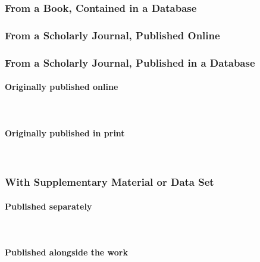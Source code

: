 \documentclass{ltxdockit}
\newcommand{\myparagraph}[1]{\paragraph{#1}\mbox{}\\}
\begin{document}
\subsubsection{From a Book, Contained in a Database} %
\label{sub:from_a_book_contained_in_a_database}
\begin{refsection}
	\printbibliography[heading=none]
\end{refsection}
\subsubsection{From a Scholarly Journal, Published Online} %
\label{sub:from_a_scholarly_journal_published_online}
\begin{refsection}
	\printbibliography[heading=none]
\end{refsection}
\subsubsection{From a Scholarly Journal, Published in a Database} %
\label{sub:from_a_scholarly_journal_published_in_a_database}
\myparagraph{Originally published online} %
\label{ssub:originally_published_online}
\begin{refsection}
	\printbibliography[heading=none]
\end{refsection}
\myparagraph{Originally published in print} %
\label{ssub:originally_published_in_print}
\begin{refsection}
	\printbibliography[heading=none]
\end{refsection}
\subsubsection{With Supplementary Material or Data Set} %
\label{sub:with_supplementary_material_or_data_set}
\myparagraph{Published separately} %
\label{ssub:published_separately}
\begin{refsection}
	\printbibliography[heading=none]
\end{refsection}
\myparagraph{Published alongside the work} %
\label{ssub:published_alongside_the_work}
\begin{refsection}
	\printbibliography[heading=none]
\end{refsection}
\end{document}
